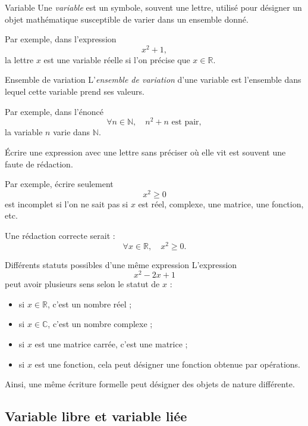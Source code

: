 \documentclass[11pt,a4paper]{article}
\begin{document}
\begin{definitionbox}{Variable}{}
Une \emph{variable} est un symbole, souvent une lettre, utilisé pour désigner un objet mathématique susceptible de varier dans un ensemble donné.

Par exemple, dans l'expression
\[
x^2+1,
\]
la lettre $x$ est une variable réelle si l'on précise que $x\in\mathbb{R}$.
\end{definitionbox}

\begin{definitionbox}{Ensemble de variation}{}
L'\emph{ensemble de variation} d'une variable est l'ensemble dans lequel cette variable prend ses valeurs.

Par exemple, dans l'énoncé
\[
\forall n\in\mathbb{N}, \quad n^2+n \text{ est pair},
\]
la variable $n$ varie dans $\mathbb{N}$.
\end{definitionbox}

\begin{erreurbox}
Écrire une expression avec une lettre sans préciser où elle vit est souvent une faute de rédaction.

Par exemple, écrire seulement
\[
x^2\geq 0
\]
est incomplet si l'on ne sait pas si $x$ est réel, complexe, une matrice, une fonction, etc.

Une rédaction correcte serait :
\[
\forall x\in\mathbb{R},\quad x^2\geq 0.
\]
\end{erreurbox}

\begin{exemplebox}{Différents statuts possibles d'une même expression}{}
L'expression
\[
x^2-2x+1
\]
peut avoir plusieurs sens selon le statut de $x$ :
\begin{itemize}
    \item si $x\in\mathbb{R}$, c'est un nombre réel ;
    \item si $x\in\mathbb{C}$, c'est un nombre complexe ;
    \item si $x$ est une matrice carrée, c'est une matrice ;
    \item si $x$ est une fonction, cela peut désigner une fonction obtenue par opérations.
\end{itemize}

Ainsi, une même écriture formelle peut désigner des objets de nature différente.
\end{exemplebox}

\subsection{Variable libre et variable liée}
\end{document}

